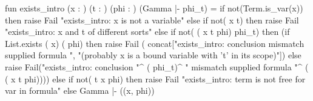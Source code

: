 \nwenddocs{}\plusendmoddef\nwstartdeflinemarkup{}\nwenddeflinemarkup
fun exists_intro (x : ) (t : ) (phi : ) (Gamma |- phi_t) =
  if not(Term.is_var(x))
  then raise Fail "exists_intro: x is not a variable"
  else if not( x t)
  then raise Fail "exists_intro: x and t of different sorts"
  else if not( ( x t phi) phi_t)
  then (if List.exists ( x) ( phi)
        then raise Fail (
            concat["exists_intro: conclusion mismatch supplied formula ",
                   "(probably x is a bound variable with 't' in its scope)"])
        else raise Fail("exists_intro: conclusion "^
                        ( phi_t)^
                        " mismatch supplied formula "^
                        ( ( x t phi))))
  else if not( t x phi)
  then raise Fail "exists_intro: term is not free for var in formula"
  else Gamma |- ((x, phi))
\eatline

